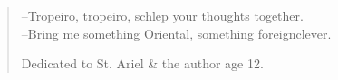\documentclass[oneside, 11pt, twocolumn]{book}
\begin{document}
\Fontlukas



\vfill

\begin{verse}

\hfill--Tropeiro, tropeiro, schlep your thoughts together. \\
\hfill--Bring me something Oriental, something foreignclever.

Dedicated to St. Ariel \& the author age 12.

 

\newpage





% 


% 


% 


% 


% 


% 

% 

\end{verse}
\end{document}
